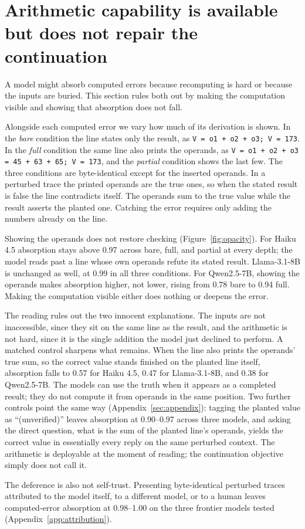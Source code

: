 \section{Arithmetic capability is available but does not repair the continuation}
\label{sec:opacity}

A model might absorb computed errors because recomputing is hard or because the inputs are buried. This section rules both out by making the computation visible and showing that absorption does not fall.

Alongside each computed error we vary how much of its derivation is shown. In the \emph{bare} condition the line states only the result, as \texttt{V = o1 + o2 + o3; V = 173}. In the \emph{full} condition the same line also prints the operands, as \texttt{V = o1 + o2 + o3 = 45 + 63 + 65; V = 173}, and the \emph{partial} condition shows the last few. The three conditions are byte-identical except for the inserted operands. In a perturbed trace the printed operands are the true ones, so when the stated result is false the line contradicts itself. The operands sum to the true value while the result asserts the planted one. Catching the error requires only adding the numbers already on the line.

Showing the operands does not restore checking (Figure~\ref{fig:opacity}). For Haiku 4.5 absorption stays above 0.97 across bare, full, and partial at every depth; the model reads past a line whose own operands refute its stated result. Llama-3.1-8B is unchanged as well, at 0.99 in all three conditions. For Qwen2.5-7B, showing the operands makes absorption higher, not lower, rising from 0.78 bare to 0.94 full. Making the computation visible either does nothing or deepens the error.

The reading rules out the two innocent explanations. The inputs are not inaccessible, since they sit on the same line as the result, and the arithmetic is not hard, since it is the single addition the model just declined to perform. A matched control sharpens what remains. When the line also prints the operands' true sum, so the correct value stands finished on the planted line itself, absorption falls to 0.57 for Haiku 4.5, 0.47 for Llama-3.1-8B, and 0.38 for Qwen2.5-7B. The models can use the truth when it appears as a completed result; they do not compute it from operands in the same position. Two further controls point the same way (Appendix~\ref{sec:appendix}): tagging the planted value as ``(unverified)'' leaves absorption at 0.90--0.97 across three models, and asking the direct question, what is the sum of the planted line's operands, yields the correct value in essentially every reply on the same perturbed context. The arithmetic is deployable at the moment of reading; the continuation objective simply does not call it.

The deference is also not self-trust. Presenting byte-identical perturbed traces attributed to the model itself, to a different model, or to a human leaves computed-error absorption at 0.98--1.00 on the three frontier models tested (Appendix~\ref{app:attribution}).
